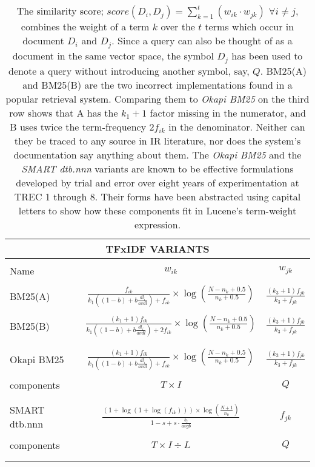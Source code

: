 \begin{table}
	\begin{center}
  \begin{small}
	 
  \begin{tabular}{lcc}
    \multicolumn{3}{c}{TFxIDF VARIANTS}\\
    \hline\hline
    \\
    Name & $w_{ik}$ & $w_{jk}$\\
    \hline
    \\
    BM25(A)
    & $\frac{f_{ik}}{k_{1}((1-b)+b\frac{dl_{i}}{avdl})+f_{ik}} \times \log(\frac{N-n_{k}+0.5}{n_{k}+0.5})$
    & $\frac{(k_{3}+1)f_{jk}}{k_{3}+f_{jk}}$ \\
    \\
    BM25(B)
    & $\frac{(k_{1}+1)f_{ik}}{k_{1}((1-b)+b\frac{dl_{i}}{avdl})+2f_{ik}} \times \log(\frac{N-n_{k}+0.5}{n_{k}+0.5})$
    & $\frac{(k_{3}+1)f_{jk}}{k_{3}+f_{jk}}$ \\
    \\\hline
    \\
    Okapi BM25
    & $\frac{(k_{1}+1)f_{ik}}{k_{1}((1-b)+b\frac{dl_{i}}{avdl})+f_{ik}} \times \log(\frac{N-n_{k}+0.5}{n_{k}+0.5})$
    & $\frac{(k_{3}+1)f_{jk}}{k_{3}+f_{jk}}$ \\
    \\
    components & $T \times I$ & $Q$ \\
    \\\hline
    \\
    SMART dtb.nnn
    & $\frac{(1+\log(1+\log(f_{ik}))) \times \log(\frac{N+1}{n_{k}})}{1-s+s \cdot \frac{b_{i}}{avgb}}$
    & $f_{jk}$ \\
    \\
    components & $T \times I \div L$ & $Q$ \\
    \\\hline\hline
  \label{tab:tfxidf}
  \end{tabular}
  \caption{\small The similarity score;
    $score(D_{i},D_{j})=\sum_{k=1}^{t}(w_{ik} \cdot w_{jk})$ $\forall
    i \neq j$, combines the weight of a term $k$ over the $t$ terms
    which occur in document $D_{i}$ and $D_{j}$. Since a query can
    also be thought of as a document in the same vector space, the
    symbol $D_{j}$ has been used to denote a query without introducing
    another symbol, say, $Q$. BM25(A) and BM25(B) are the two
    incorrect implementations found in a popular retrieval
    system. Comparing them to \emph{Okapi BM25} on the third row shows
    that A has the $k_{1}+1$ factor missing in the numerator, and B
    uses twice the term-frequency $2f_{ik}$ in the
    denominator. Neither can they be traced to any source in IR
    literature, nor does the system's documentation say anything about
    them. The \emph{Okapi BM25} and the \emph{SMART dtb.nnn} variants
    are known to be effective formulations developed by trial and
    error over eight years of experimentation at TREC 1 through
    8. Their forms have been abstracted using capital letters to show
    how these components fit in Lucene's term-weight expression.}
	\end{small}
	\end{center}
\end{table}

